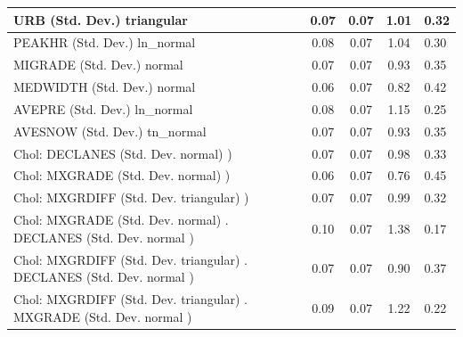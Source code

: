 \begin{table}
\begin{center}
\begin{tabular}{|l|l|c|c|c|l|}
			\hline
			URB (Std. Dev.) triangular &  & 0.07 & 0.07 & 1.01 & 0.32 \\
			\hline
			PEAKHR (Std. Dev.) ln_normal &  & 0.08 & 0.07 & 1.04 & 0.30 \\
			\hline
			MIGRADE (Std. Dev.) normal &  & 0.07 & 0.07 & 0.93 & 0.35 \\
			\hline
			MEDWIDTH (Std. Dev.) normal &  & 0.06 & 0.07 & 0.82 & 0.42 \\
			\hline
			AVEPRE (Std. Dev.) ln_normal &  & 0.08 & 0.07 & 1.15 & 0.25 \\
			\hline
			AVESNOW (Std. Dev.) tn_normal &  & 0.07 & 0.07 & 0.93 & 0.35 \\
			\hline
			 Chol: DECLANES (Std. Dev. normal) ) &  & 0.07 & 0.07 & 0.98 & 0.33 \\
			\hline
			 Chol: MXGRADE (Std. Dev. normal) ) &  & 0.06 & 0.07 & 0.76 & 0.45 \\
			\hline
			 Chol: MXGRDIFF (Std. Dev. triangular) ) &  & 0.07 & 0.07 & 0.99 & 0.32 \\
			\hline
			 Chol: MXGRADE (Std. Dev. normal) . DECLANES (Std. Dev.   normal ) &  & 0.10 & 0.07 & 1.38 & 0.17 \\
			\hline
			 Chol: MXGRDIFF (Std. Dev. triangular) . DECLANES (Std. Dev.   normal ) &  & 0.07 & 0.07 & 0.90 & 0.37 \\
			\hline
			 Chol: MXGRDIFF (Std. Dev. triangular) . MXGRADE (Std. Dev.   normal ) &  & 0.09 & 0.07 & 1.22 & 0.22 \\
			\hline
		\end{tabular}
	\end{center}
\end{table}